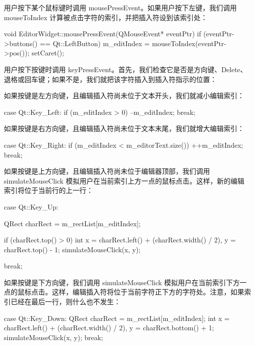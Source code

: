 用户按下某个鼠标键时调用 mousePressEvent。如果用户按下左键，我们调用 mouseToIndex 计算被点击字符的索引，并把插入符设到该索引处：

\begin{codebox}
void EditorWidget::mousePressEvent(QMouseEvent* eventPtr) {
  if (eventPtr->buttons() == Qt::LeftButton) {
    m_editIndex = mouseToIndex(eventPtr->pos());
    setCaret();
  }
}
\end{codebox}

用户按下按键时调用 keyPressEvent。首先，我们检查它是否是方向键、Delete、退格或回车键；如果不是，我们就把该字符插入到插入符指示的位置：

\begin{codebox}
void EditorWidget::keyPressEvent(QKeyEvent* eventPtr) {
  switch (eventPtr->key()) {
\end{codebox}

如果按键是左方向键，且编辑插入符尚未位于文本开头，我们就减小编辑索引：

\begin{codebox}
    case Qt::Key_Left:
      if (m_editIndex > 0) {
        --m_editIndex;
      }
      break;
\end{codebox}

如果按键是右方向键，且编辑插入符尚未位于文本末尾，我们就增大编辑索引：

\begin{codebox}
    case Qt::Key_Right:
      if (m_editIndex < m_editorText.size()) {
        ++m_editIndex;
      }
      break;
\end{codebox}

如果按键是上方向键，且编辑插入符尚未位于编辑器顶部，我们调用 simulateMouseClick 模拟用户在当前索引上方一点的鼠标点击。这样，新的编辑索引将位于当前行的上一行：

\begin{codebox}
    case Qt::Key_Up: {
        QRect charRect = m_rectList[m_editIndex];

        if (charRect.top() > 0) {
          int x = charRect.left() + (charRect.width() / 2),
              y = charRect.top() - 1;
          simulateMouseClick(x, y);
        }
      }
      break;
\end{codebox}

如果按键是下方向键，我们调用 simulateMouseClick 模拟用户在当前索引下方一点的鼠标点击。这样，编辑插入符将位于当前字符正下方的字符处。注意，如果索引已经在最后一行，则什么也不发生：

\begin{codebox}
    case Qt::Key_Down: {
        QRect charRect = m_rectList[m_editIndex];
        int x = charRect.left() + (charRect.width() / 2),
            y = charRect.bottom() + 1;
        simulateMouseClick(x, y);
      }
      break;
\end{codebox}

